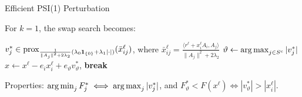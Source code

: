 \begin{frame}{Efficient PSI(1) Perturbation}
\begin{small}
For $k=1$, the swap search becomes:
\begin{algorithmic}[1]
\State $v_j^* \in \operatorname{prox}_{\frac{1}{\|A_j\|^2+2\lambda_2}(\lambda_0\mathbf{1}_{\{0\}}+\lambda_1|\cdot|)}(\bar{x}_{ij}^\ell)$, where 
$\bar{x}_{ij}^\ell = \frac{\langle r^\ell + x_i^\ell A_i, A_j\rangle}{\|A_j\|^2+2\lambda_2}$
\EndFor
\State $\vartheta \gets \operatorname{arg\,max}_{j\in S^c} |v_j^*|$
\State $\hat{x} \gets x^\ell - e_i x_i^\ell + e_\vartheta v_\vartheta^*$, \textbf{break}
\EndIf
\EndFor
\end{algorithmic}
Properties: $\operatorname{arg\,min}_j F_j^* \iff \operatorname{arg\,max}_j |v_j^*|$, and $F_\vartheta^* < F(x^\ell) \iff |v_\vartheta^*| > |x_i^\ell|$.
\end{small}
\end{frame}